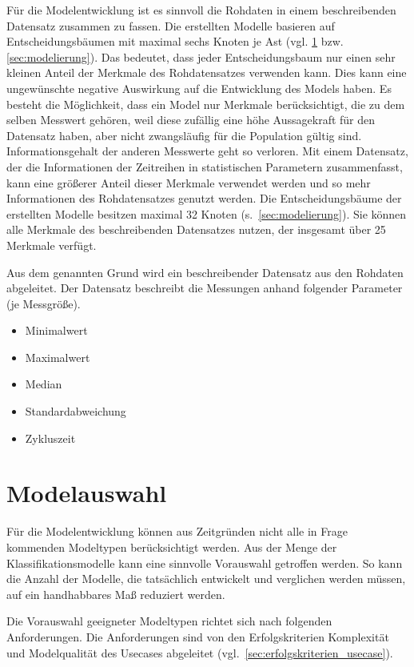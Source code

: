 Für die Modelentwicklung ist es sinnvoll die Rohdaten in einem beschreibenden Datensatz zusammen zu fassen. Die erstellten Modelle basieren auf Entscheidungsbäumen mit maximal sechs Knoten je Ast (vgl. \cref{sec:modelauswahl} bzw. \cref{sec:modelierung}). Das bedeutet, dass jeder Entscheidungsbaum nur einen sehr kleinen Anteil der Merkmale des Rohdatensatzes verwenden kann. Dies kann eine ungewünschte negative Auswirkung auf die Entwicklung des Models haben. Es besteht die Möglichkeit, dass ein Model nur Merkmale berücksichtigt, die zu dem selben Messwert gehören, weil diese zufällig eine höhe Aussagekraft für den Datensatz haben, aber nicht zwangsläufig für die Population gültig sind. Informationsgehalt der anderen Messwerte geht so verloren. Mit einem Datensatz, der die Informationen der Zeitreihen in statistischen Parametern zusammenfasst, kann eine größerer Anteil dieser Merkmale verwendet werden und so mehr Informationen des Rohdatensatzes genutzt werden. Die Entscheidungsbäume der erstellten Modelle besitzen maximal \num{32} Knoten (s.~\cref{sec:modelierung}). Sie können alle Merkmale des beschreibenden Datensatzes nutzen, der insgesamt über \num{25} Merkmale verfügt.

Aus dem genannten Grund wird ein beschreibender Datensatz aus den Rohdaten abgeleitet. Der Datensatz beschreibt die Messungen anhand folgender Parameter (je Messgröße).
\begin{itemize}
	\item Minimalwert
	\item Maximalwert
	\item Median
	\item Standardabweichung
	\item Zykluszeit
\end{itemize}
\section{Modelauswahl}
\label{sec:modelauswahl}
Für die Modelentwicklung können aus Zeitgründen nicht alle in Frage kommenden Modeltypen berücksichtigt werden. Aus der Menge der Klassifikationsmodelle kann eine sinnvolle Vorauswahl getroffen werden. So kann die Anzahl der Modelle, die tatsächlich entwickelt und verglichen werden müssen, auf ein handhabbares Maß reduziert werden.

Die Vorauswahl geeigneter Modeltypen richtet sich nach folgenden Anforderungen. Die Anforderungen sind von den Erfolgskriterien Komplexität und Modelqualität des Usecases abgeleitet (vgl.~\cref{sec:erfolgskriterien_usecase}).

